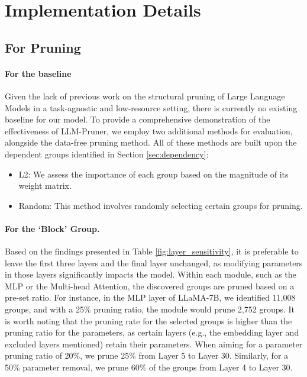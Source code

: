 \section{Implementation Details} \label{sec:apx_implementation_details}
\subsection{For Pruning}
\paragraph{For the baseline}
Given the lack of previous work on the structural pruning of Large Language Models in a task-agnostic and low-resource setting, there is currently no existing baseline for our model. To provide a comprehensive demonstration of the effectiveness of LLM-Pruner, we employ two additional methods for evaluation, alongside the data-free pruning method. All of these methods are built upon the dependent groups identified in Section \ref{sec:dependency}:
\begin{itemize}[leftmargin=*]
    \item L2: We assess the importance of each group based on the magnitude of its weight matrix. 
    \item Random: This method involves randomly selecting certain groups for pruning.
\end{itemize}

\paragraph{For the `Block' Group.}

Based on the findings presented in Table \ref{fig:layer_sensitivity}, it is preferable to leave the first three layers and the final layer unchanged, as modifying parameters in those layers significantly impacts the model. Within each module, such as the MLP or the Multi-head Attention, the discovered groups are pruned based on a pre-set ratio. For instance, in the MLP layer of LLaMA-7B, we identified 11,008 groups, and with a 25\% pruning ratio, the module would prune 2,752 groups. It is worth noting that the pruning rate for the selected groups is higher than the pruning ratio for the parameters, as certain layers (e.g., the embedding layer and excluded layers mentioned) retain their parameters.
When aiming for a parameter pruning ratio of 20\%, we prune 25\% from Layer 5 to Layer 30. Similarly, for a 50\% parameter removal, we prune 60\% of the groups from Layer 4 to Layer 30. 


